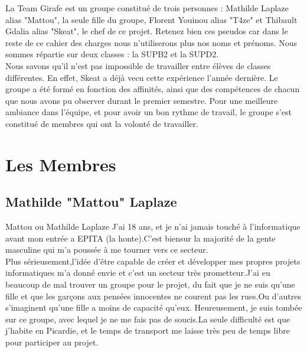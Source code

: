 \documentclass [11pt]{report}
\begin{document}
		La Team Girafe est  un groupe constitué de trois personnes : Mathilde Laplaze alias "Mattou", la seule fille du groupe, Florent Youinou alias "T4ze" et Thibault Gdalia alias "Skeat", le chef de ce projet. Retenez bien ces pseudos car dans le reste de ce cahier des charges nous n'utiliserons plus nos 		noms et pr\'enoms. Nous sommes r\'epartie sur deux classes : la SUPB2 et la SUPD2. \\
		\indent  Nous savons qu'il n'est pas impossible de travailler entre \'el\`eves de classes diff\'erentes. En effet, Skeat a déjà vecu cette expérience l'année dernière. Le groupe a \'et\'e form\'e en fonction des affinit\'es, ainsi que des comp\'etences de chacun que nous avons pu observer durant le premier semestre. 		Pour une meilleure ambiance dans l'\'equipe, et pour avoir un bon rythme de travail, le groupe s'est constitué de membres qui ont la volont\'e de travailler. 
	
	
	
	\newpage

	\section { Les Membres }
		\subsection {Mathilde "Mattou" Laplaze}
			Mattou ou Mathilde Laplaze J'ai 18 ans, et je n'ai jamais touché à l'informatique avant mon entrée a EPITA (la honte).C'est biensur la majorité de la gente masculine qui m'a poussée à me tourner vers ce secteur.\\
			\indent Plus sérieusement,l'idée d'être capable de créer et développer mes propres projets informatiques m'a donné envie et c'est un secteur très prometteur.J'ai eu beaucoup de mal trouver un groupe pour le projet, du fait que je ne suis qu'une fille et que les garçons aux pensées innocentes ne courent pas les rues.Ou 			d'autres s'imaginent qu'une fille a moins de capacité qu'eux. Heureusement, je suis tombée sur ce groupe, avec lequel je ne me fais pas de soucis.La seule difficulté est que j'habite en Picardie, et le temps de transport me laisse très peu de temps libre pour participer au projet.\\\vspace{10mm}
	
		
	
\end{document}
